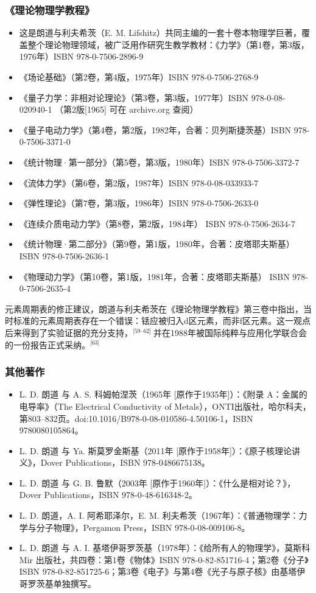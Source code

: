 \subsubsection{《理论物理学教程》}
\begin{itemize}
\item 这是朗道与利夫希茨（E. M. Lifshitz）共同主编的一套十卷本物理学巨著，覆盖整个理论物理领域，被广泛用作研究生教学教材：《力学》（第1卷，第3版，1976年）ISBN 978-0-7506-2896-9
\item 《场论基础》（第2卷，第4版，1975年）ISBN 978-0-7506-2768-9
\item 《量子力学：非相对论理论》（第3卷，第3版，1977年）ISBN 978-0-08-020940-1 （第2版[1965] 可在 archive.org 查阅）
\item 《量子电动力学》（第4卷，第2版，1982年，合著：贝列斯捷茨基）ISBN 978-0-7506-3371-0
\item 《统计物理·第一部分》（第5卷，第3版，1980年）ISBN 978-0-7506-3372-7
\item 《流体力学》（第6卷，第2版，1987年）ISBN 978-0-08-033933-7
\item 《弹性理论》（第7卷，第3版，1986年）ISBN 978-0-7506-2633-0
\item 《连续介质电动力学》（第8卷，第2版，1984年）
   ISBN 978-0-7506-2634-7
\item 《统计物理·第二部分》（第9卷，第1版，1980年，合著：皮塔耶夫斯基）
   ISBN 978-0-7506-2636-1
\item 《物理动力学》（第10卷，第1版，1981年，合著：皮塔耶夫斯基）
    ISBN 978-0-7506-2635-4
\end{itemize}
元素周期表的修正建议，朗道与利夫希茨在《理论物理学教程》第三卷中指出，当时标准的元素周期表存在一个错误：铥应被归入d区元素，而非f区元素。这一观点后来得到了实验证据的充分支持，\(^\text{[59–62] }\)并在1988年被国际纯粹与应用化学联合会的一份报告正式采纳。\(^\text{[63]}\)
\subsubsection{其他著作}
\begin{itemize}
\item L. D. 朗道 与 A. S. 科姆帕涅茨（1965年 [原作于1935年]）：《附录 A：金属的电导率》（The Electrical Conductivity of Metals），ONTI出版社，哈尔科夫，第803–832页。doi:10.1016/B978-0-08-010586-4.50106-1，ISBN 9780080105864。
\item  L. D. 朗道 与 Ya. 斯莫罗金斯基（2011年 [原作于1958年]）：《原子核理论讲义》，Dover Publications，ISBN 978-0486675138。
\item L. D. 朗道 与 G. B. 鲁默（2003年 [原作于1960年]）：《什么是相对论？》，Dover Publications，ISBN 978-0-48-616348-2。
\item L. D. 朗道，A. I. 阿希耶泽尔，E. M. 利夫希茨（1967年）：《普通物理学：力学与分子物理》，Pergamon Press，ISBN 978-0-08-009106-8。
\item L. D. 朗道 与 A. I. 基塔伊哥罗茨基（1978年）：《给所有人的物理学》，莫斯科 Mir 出版社，共四卷：第1卷《物体》ISBN 978-0-82-851716-4；第2卷《分子》ISBN 978-0-82-851725-6；第3卷《电子》与第4卷《光子与原子核》由基塔伊哥罗茨基单独撰写。
\end{itemize}

